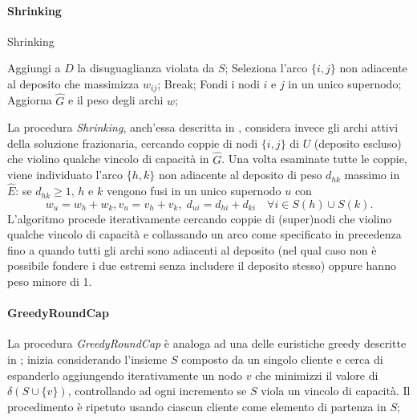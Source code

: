 \documentclass[11pt,oneside,a4paper]{article}
\begin{document}
\paragraph{Shrinking}
\begin{algorithm}
\caption{Shrinking}

\begin{algorithmic}[1]

      \State Aggiungi a $D$ la disuguaglianza violata da $S$;
    \EndIf
    \State Seleziona l'arco $\{i,j\}$ non adiacente al deposito che massimizza $w_{ij}$;
      \State Break;
    \Else
      \State Fondi i nodi $i$ e $j$ in un unico supernodo;
      \State Aggiorna $\hat{G}$ e il peso degli archi $w$;
    \EndIf
  \EndWhile

\end{algorithmic}
\end{algorithm}
La procedura \emph{Shrinking}, anch'essa descritta in \cite{ralphs03},
considera invece gli archi attivi della soluzione frazionaria, cercando coppie di
nodi $\{i,j\}$ di $U$ (deposito escluso) che violino qualche vincolo di capacità in $\hat{G}$.
Una volta esaminate tutte le coppie, viene individuato l'arco $\{h,k\}$ non adiacente al
deposito di peso $d_{hk}$ massimo in $\hat{E}$: se $d_{hk} \geq 1$, $h$ e $k$ vengono fusi
in un unico supernodo $u$ con 
\begin{equation*}
w_u = w_h+w_k, v_u = v_h+v_k,\; d_{ui} = d_{hi}+d_{ki} \quad\forall i \in S(h) \cup S(k).
\end{equation*}
L'algoritmo procede iterativamente cercando coppie di
(super)nodi che violino qualche vincolo di capacità e collassando un arco come
specificato in precedenza fino a quando 
tutti gli archi sono adiacenti al deposito (nel qual caso non è possibile fondere i due
estremi senza includere il deposito stesso) oppure hanno peso minore di 1.

\paragraph{GreedyRoundCap}
La procedura \emph{GreedyRoundCap} è analoga ad una delle euristiche greedy descritte in
\cite{augerat98}; inizia considerando l'insieme $S$ composto da
un singolo cliente e cerca di espanderlo aggiungendo iterativamente un nodo
$v$ che minimizzi il valore di $\delta(S \cup \{v\})$, controllando ad ogni incremento se
$S$ viola un vincolo di capacità. Il procedimento è ripetuto usando ciascun cliente come elemento
di partenza in $S$;
\end{document}
